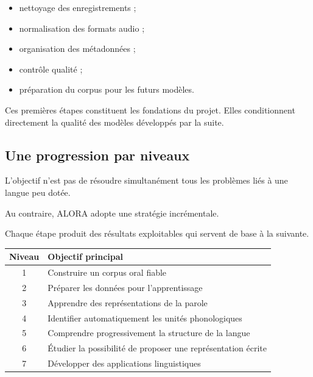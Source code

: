 \begin{itemize}

\item nettoyage des enregistrements ;

\item normalisation des formats audio ;

\item organisation des métadonnées ;

\item contrôle qualité ;

\item préparation du corpus pour les futurs modèles.

\end{itemize}

Ces premières étapes constituent les fondations du projet. Elles conditionnent
directement la qualité des modèles développés par la suite.


\subsection{Une progression par niveaux}

L'objectif n'est pas de résoudre simultanément tous les problèmes liés à une
langue peu dotée.

Au contraire, ALORA adopte une stratégie incrémentale.

Chaque étape produit des résultats exploitables qui servent de base à la
suivante.

\begin{center}

\begin{tabular}{cl}

\toprule

Niveau & Objectif principal \\

\midrule

1 & Construire un corpus oral fiable \\

2 & Préparer les données pour l'apprentissage \\

3 & Apprendre des représentations de la parole \\

4 & Identifier automatiquement les unités phonologiques \\

5 & Comprendre progressivement la structure de la langue \\

6 & Étudier la possibilité de proposer une représentation écrite \\

7 & Développer des applications linguistiques \\

\bottomrule

\end{tabular}

\end{center}

